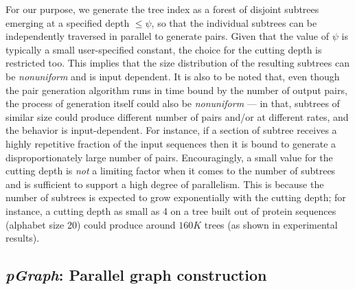 \documentclass[10pt,journal,letterpaper,compsoc]{IEEEtran}
\begin{document}
For our purpose, we generate the tree index as a forest of disjoint subtrees emerging at a specified depth $\leq\psi$, so that the individual subtrees can be independently traversed in parallel to generate pairs. Given that the value of $\psi$ is typically a small user-specified constant, the choice for the cutting depth is restricted too. This implies that the size distribution of the resulting subtrees can be \emph{nonuniform} and is input dependent. It is also to be noted that, even though the pair generation algorithm runs in time bound by the number of output pairs, the process of generation itself could also be \emph{nonuniform} --- in that, subtrees of similar size could produce different number of pairs and/or at different rates, and the behavior is input-dependent. For instance, if a section of subtree receives a highly repetitive fraction of the input sequences then it is bound to generate a disproportionately large number of pairs. Encouragingly, a small value for the cutting depth is \emph{not} a limiting factor when it comes to the number of subtrees and is sufficient to support a high degree of parallelism. This is because the number of subtrees is expected to grow exponentially with the cutting depth; for instance, a cutting depth as small as 4 on a tree built out of protein sequences (alphabet size 20) could produce around $160K$ trees (as shown in experimental results). 





\subsection{{\it pGraph}: Parallel graph construction}
\label{secMasterSlave}
\end{document}
